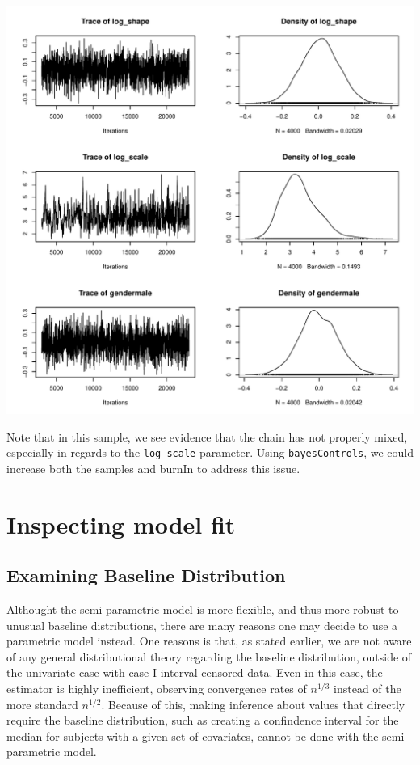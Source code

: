 \documentclass[a4paper]{article}
\begin{document}
\begin{Schunk}
\end{Schunk}
\includegraphics{icenReg-020}

Note that in this sample, we see evidence that the chain has not properly mixed, especially in regards to the \texttt{log\_scale} parameter. Using \texttt{bayesControls}, we could increase both the samples and burnIn to address this issue. 

\section{Inspecting model fit}

\subsection{Examining Baseline Distribution}
  
Althought the semi-parametric model is more flexible, and thus more robust to unusual baseline distributions, there are many reasons one may decide to use a parametric model instead. One reasons is that, as stated earlier, we are not aware of any general distributional theory regarding the baseline distribution, outside of the univariate case with case I interval censored data. Even in this case, the estimator is highly inefficient, observing convergence rates of $n^{1/3}$ instead of the more standard $n^{1/2}$. Because of this, making inference about values that directly require the baseline distribution, such as creating a confindence interval for the median for subjects with a given set of covariates, cannot be done with the semi-parametric model. 
  
\end{document}
